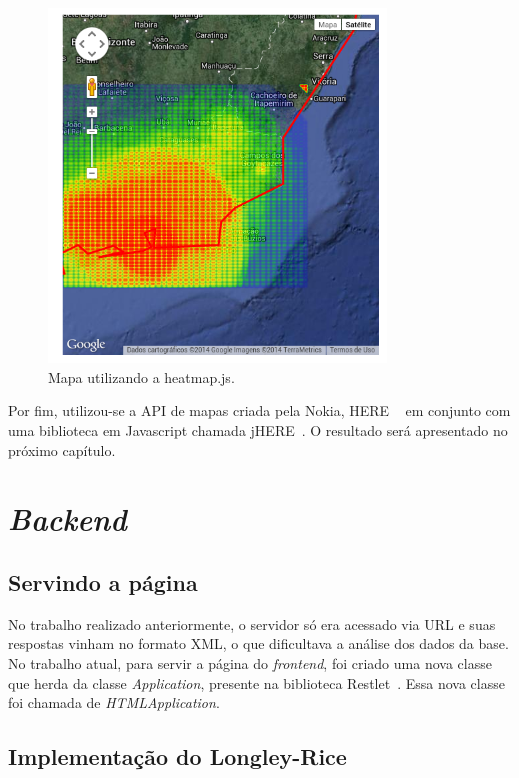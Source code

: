 \begin{figure}[htb]
\centering
\includegraphics[width=0.8\textwidth]{figs/heatmapjs}
\caption[Mapa utilizando a heatmap.js.]
{Mapa utilizando a heatmap.js.}
\label{fig:heatmapjs}
\end{figure} 

\FloatBarrier

Por fim, utilizou-se a API de mapas criada pela Nokia, HERE ~\cite{heremaps} em conjunto com uma biblioteca em Javascript chamada jHERE~\cite{jhere}. O resultado será apresentado no próximo capítulo.

\section{\textit{Backend}}

\subsection{Servindo a página}

No trabalho realizado anteriormente, o servidor só era acessado via URL e suas respostas vinham no formato XML, o que dificultava a análise dos dados da base. No trabalho atual, para servir a página do \textit{frontend}, foi criado uma nova classe que herda da classe \textit{Application}, presente na biblioteca Restlet~\cite{restlet}. Essa nova classe foi chamada de \textit{HTMLApplication}.

\subsection{Implementação do Longley-Rice}

